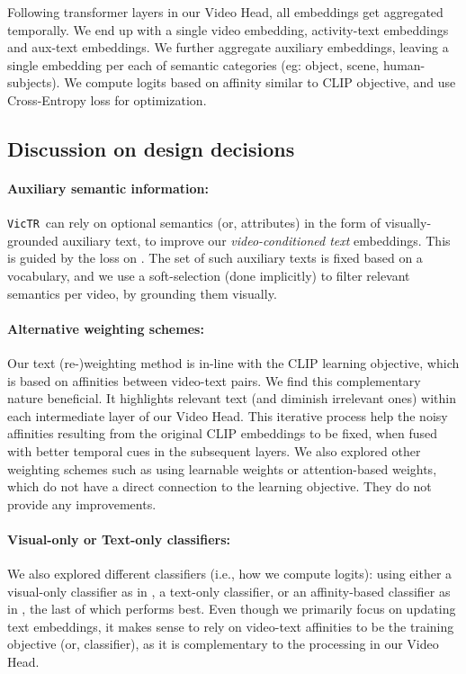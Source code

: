 \documentclass[10pt,twocolumn,letterpaper]{article}
\newcommand{\ours}{\texttt{VicTR}}
\begin{document}
Following  transformer layers in our Video Head, all embeddings get aggregated temporally. We end up with a single video embedding,  activity-text embeddings and  aux-text embeddings. We further aggregate auxiliary embeddings, leaving a single embedding per each of  semantic categories (eg: object, scene, human-subjects). We compute logits based on affinity similar to CLIP \cite{radford2021clip} objective, and use Cross-Entropy loss for optimization. 


\subsection{Discussion on design decisions}

\paragraph{Auxiliary semantic information:} \ours~can rely on optional semantics (or, attributes) in the form of visually-grounded auxiliary text, to improve our \textit{video-conditioned text} embeddings. This is guided by the loss on . The set of such auxiliary texts is fixed based on a vocabulary, and we use a soft-selection (done implicitly) to filter relevant semantics per video, by grounding them visually. 

\paragraph{Alternative weighting schemes:} Our text (re-)weighting method is in-line with the CLIP \cite{radford2021clip} learning objective, which is based on affinities between video-text pairs. We find this complementary nature beneficial. It highlights relevant text (and diminish irrelevant ones) within each intermediate layer of our Video Head. This iterative process help the noisy affinities resulting from the original CLIP embeddings to be fixed, when fused with better temporal cues in the subsequent layers. We also explored other weighting schemes such as using learnable weights or attention-based weights, which do not have a direct connection to the learning objective. They do not provide any improvements. 

\paragraph{Visual-only or Text-only classifiers:} We also explored different classifiers (i.e., how we compute logits): using either a visual-only classifier as in  \cite{lin2022evl}, a text-only classifier, or an affinity-based classifier as in \cite{radford2021clip, ma2022xclip}, the last of which performs best. Even though we primarily focus on updating text embeddings, it makes sense to rely on video-text affinities to be the training objective (or, classifier), as it is complementary to the processing in our Video Head.
\end{document}
